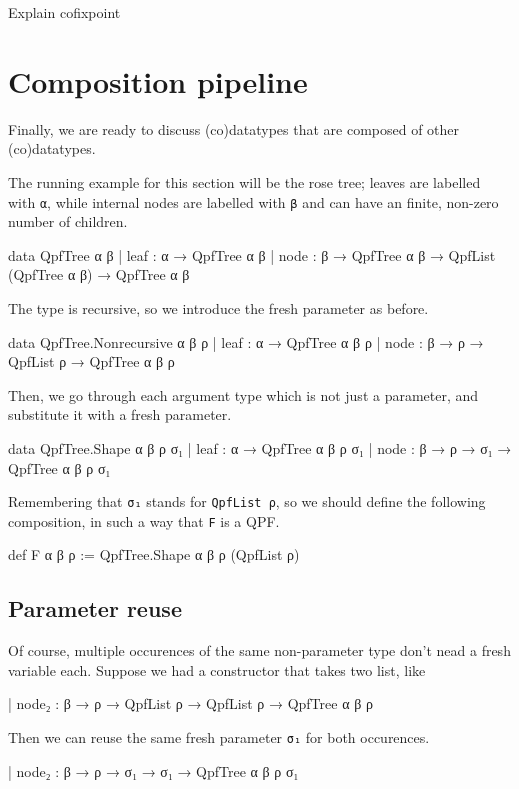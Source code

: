 \documentclass[titlepage]{report}
\newenvironment{todo}[1][Todo:]{\begin{trivlist}                         
    \item[\hskip \labelsep {\bfseries #1}]}{\end{trivlist}}
\begin{document}
\begin{todo}
    Explain cofixpoint
\end{todo}



\section{Composition pipeline}
Finally, we are ready to discuss (co)datatypes that are composed of other (co)datatypes.

The running example for this section will be the rose tree; leaves are labelled with \texttt{α}, while
internal nodes are labelled with \texttt{β} and can have an finite, non-zero number of children.
\begin{leancode}
    data QpfTree α β
      | leaf : α → QpfTree α β
      | node : β → QpfTree α β → QpfList (QpfTree α β) → QpfTree α β
\end{leancode}

The type is recursive, so we introduce the fresh parameter as before.
\begin{leancode}
    data QpfTree.Nonrecursive α β ρ
      | leaf : α → QpfTree α β ρ
      | node : β → ρ → QpfList ρ → QpfTree α β ρ
\end{leancode}

Then, we go through each argument type which is not just a parameter, and substitute
it with a fresh parameter.

\begin{leancode}
    data QpfTree.Shape α β ρ σ₁
      | leaf : α → QpfTree α β ρ σ₁
      | node : β → ρ → σ₁ → QpfTree α β ρ σ₁
\end{leancode}
Remembering that \texttt{σ₁} stands for \texttt{QpfList ρ}, so we should define the following 
composition, in such a way that \texttt{F} is a QPF.
\begin{leancode}
    def F α β ρ := QpfTree.Shape α β ρ (QpfList ρ)
\end{leancode}


\subsection{Parameter reuse}
Of course, multiple occurences of the same non-parameter type don't nead a fresh variable each.
Suppose we had a constructor that takes two list, like
\begin{leancode}
    | node₂ : β → ρ → QpfList ρ → QpfList ρ → QpfTree α β ρ
\end{leancode}
Then we can reuse the same fresh parameter \texttt{σ₁} for both occurences.
\begin{leancode}
    | node₂ : β → ρ → σ₁ → σ₁ → QpfTree α β ρ σ₁
\end{leancode}
\end{document}
